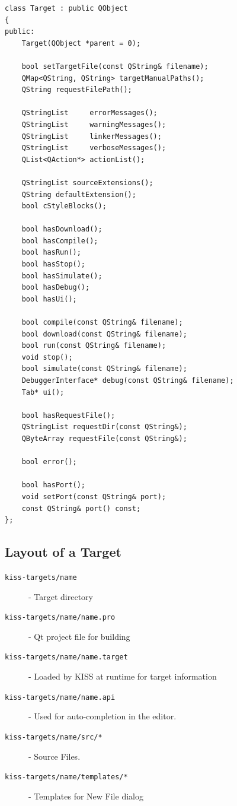 \documentclass[7pt,letterpaper]{article}
\newcommand{\code}[1]{\texttt{#1}}
\begin{document}
	\begin{lstlisting}
class Target : public QObject
{
public:
	Target(QObject *parent = 0);

	bool setTargetFile(const QString& filename);
	QMap<QString, QString> targetManualPaths();
	QString requestFilePath();

	QStringList 	errorMessages();
	QStringList 	warningMessages();
	QStringList 	linkerMessages();
	QStringList 	verboseMessages();
	QList<QAction*> actionList();

	QStringList sourceExtensions();
	QString defaultExtension();
	bool cStyleBlocks();
	
	bool hasDownload();
	bool hasCompile();
	bool hasRun();
	bool hasStop();
	bool hasSimulate();
	bool hasDebug();
	bool hasUi();

	bool compile(const QString& filename);
	bool download(const QString& filename);
	bool run(const QString& filename);
	void stop();
	bool simulate(const QString& filename);
	DebuggerInterface* debug(const QString& filename);
	Tab* ui();

	bool hasRequestFile();
	QStringList requestDir(const QString&);
	QByteArray requestFile(const QString&);

	bool error();

	bool hasPort();
	void setPort(const QString& port);
	const QString& port() const;
};
	\end{lstlisting}
	\vspace{.25in}
	
	\subsection{Layout of a Target}
	\begin{description}
	\item[\code{kiss-targets/name}] - Target directory
	\item[\code{kiss-targets/name/name.pro}] - Qt project file for building
	\item[\code{kiss-targets/name/name.target}] - Loaded by KISS at runtime for target information
	\item[\code{kiss-targets/name/name.api}] - Used for auto-completion in the editor.
	\item[\code{kiss-targets/name/src/*}] - Source Files.
	\item[\code{kiss-targets/name/templates/*}] - Templates for New File dialog
	\end{description}
	\singlespacing
	
\end{document}
